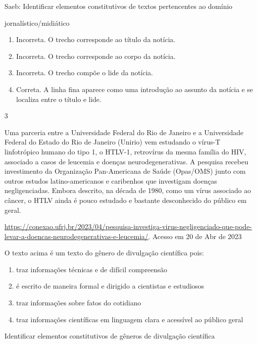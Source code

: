 {{\begin{itemize}
\begin{itemize}
Saeb: Identificar elementos constitutivos de textos pertencentes ao
domínio

jornalístico/midiático

\begin{enumerate}
\def\labelenumi{\arabic{enumi}.}
\item
  Incorreta. O trecho corresponde ao título da notícia.
\item
  Incorreta. O trecho corresponde ao corpo da notícia.
\item
  Incorreta. O trecho compõe o lide da notícia.
\item
  Correta. A linha fina aparece como uma introdução ao assunto da
  notícia e se localiza entre o título e lide.
\end{enumerate}

\num{3}

Uma parceria entre a Universidade Federal do Rio de Janeiro e a
Universidade Federal do Estado do Rio de Janeiro (Unirio) vem estudando
o vírus-T linfotrópico humano do tipo 1, o HTLV-1, retrovírus da mesma
família do HIV, associado a casos de leucemia e doenças
neurodegenerativas. A pesquisa recebeu investimento da Organização
Pan-Americana de Saúde (Opas/OMS) junto com outros estudos
latino-americanos e caribenhos que investigam doenças negligenciadas.
Embora descrito, na década de 1980, como um vírus associado ao câncer, o
HTLV ainda é pouco estudado e bastante desconhecido do público em geral.

\href{https://conexao.ufrj.br/2023/04/pesquisa-investiga-virus-negligenciado-que-pode-levar-a-doencas-neurodegenerativas-e-leucemia/}{\uline{https://conexao.ufrj.br/2023/04/pesquisa-investiga-virus-negligenciado-que-pode-levar-a-doencas-neurodegenerativas-e-leucemia/}}.
Acesso em 20 de Abr de 2023

O texto acima é um texto do gênero de divulgação científica pois:

\begin{enumerate}
\def\labelenumi{\alph{enumi})}
\item
  traz informações técnicas e de difícil compreensão
\item
  é escrito de maneira formal e dirigido a cientistas e estudiosos
\item
  traz informações sobre fatos do cotidiano
\item
  traz informações científicas em linguagem clara e acessível ao público
  geral
\end{enumerate}

Identificar elementos constitutivos de gêneros de divulgação científica


\end{itemize}
\end{itemize}}}
